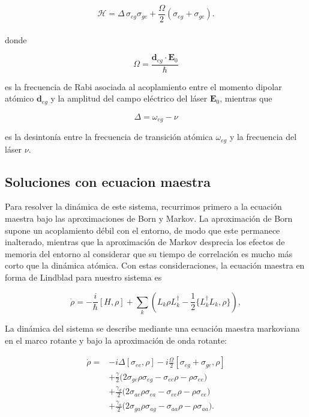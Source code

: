 \documentclass[12pt]{article}
\begin{document}
\begin{equation}
\mathcal{H} = \Delta \, \sigma_{eg} \sigma_{ge}
+\frac{\Omega}{2} ( \sigma_{eg} + \sigma_{ge} ) .
\end{equation}
\\
donde

\begin{equation}
\Omega=\frac{\mathbf{d}_{eg}\cdot\mathbf{E}_0}{\hbar}
\end{equation}

es la frecuencia de Rabi asociada al acoplamiento entre el momento dipolar atómico $\mathbf{d}_{eg}$ y la amplitud del campo eléctrico del láser $\mathbf{E}_0$, mientras que

\begin{equation}
\Delta=\omega_{eg}-\nu
\end{equation}

es la desintonía entre la frecuencia de transición atómica $\omega_{eg}$ y la frecuencia del láser $\nu$.


\subsection{Soluciones con ecuacion maestra}
Para resolver la dinámica de este sistema, recurrimos primero a la ecuación maestra bajo las aproximaciones de Born y Markov. La aproximación de Born supone un acoplamiento débil con el entorno, de modo que este permanece inalterado, mientras que la aproximación de Markov desprecia los efectos de memoria del entorno al considerar que su tiempo de correlación es mucho más corto que la dinámica atómica. Con estas consideraciones, la ecuación maestra en forma de Lindblad para nuestro sistema es

\begin{equation}
\dot{\rho} = -\frac{i}{\hbar}[H, \rho] + \sum_k \left( L_k \rho L_k^\dagger - \frac{1}{2}\{L_k^\dagger L_k, \rho\} \right),
\end{equation}


La dinámica del sistema se describe mediante una ecuación maestra markoviana en el marco rotante y bajo la aproximación de onda rotante:

\begin{equation}
\begin{split}
\dot{\rho} ={}& -i\Delta [\sigma_{ee},\rho]
- i\frac{\Omega}{2}[\sigma_{eg}+\sigma_{ge},\rho] \\
&+ \frac{\gamma}{2}\bigl(2\sigma_{ge}\rho \sigma_{eg} - \sigma_{ee}\rho - \rho \sigma_{ee}\bigr) \\
&+ \frac{\gamma_d}{2}\bigl(2\sigma_{ae}\rho \sigma_{ea} - \sigma_{ee}\rho - \rho \sigma_{ee}\bigr) \\
&+ \frac{\gamma_a}{2}\bigl(2\sigma_{ga}\rho \sigma_{ag} - \sigma_{aa}\rho - \rho \sigma_{aa}\bigr).
\end{split}
\end{equation}
\end{document}
